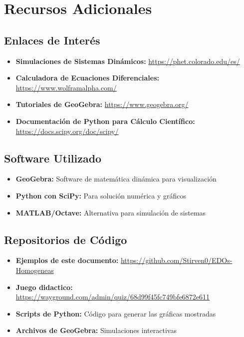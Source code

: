 \documentclass[12pt]{article}
\begin{document}
\section{Recursos Adicionales}

\subsection{Enlaces de Interés}

\begin{itemize}
    \item \textbf{Simulaciones de Sistemas Dinámicos:} 
    \url{https://phet.colorado.edu/es/}
    
    \item \textbf{Calculadora de Ecuaciones Diferenciales:} 
    \url{https://www.wolframalpha.com/}
    
    \item \textbf{Tutoriales de GeoGebra:} 
    \url{https://www.geogebra.org/}
    
    \item \textbf{Documentación de Python para Cálculo Científico:} 
    \url{https://docs.scipy.org/doc/scipy/}
\end{itemize}

\subsection{Software Utilizado}

\begin{itemize}
    \item \textbf{GeoGebra:} Software de matemática dinámica para visualización
    \item \textbf{Python con SciPy:} Para solución numérica y gráficos
    \item \textbf{MATLAB/Octave:} Alternativa para simulación de sistemas
\end{itemize}

\subsection{Repositorios de Código}

\begin{itemize}
    \item \textbf{Ejemplos de este documento:} 
    \url{https://github.com/Stirven0/EDOs-Homogeneas}
    \item \textbf{Juego didactico:} 
    \url{https://wayground.com/admin/quiz/68d99f45fc749bfe6872e611}
    
    \item \textbf{Scripts de Python:} Código para generar las gráficas mostradas
    \item \textbf{Archivos de GeoGebra:} Simulaciones interactivas
\end{itemize}
\end{document}
